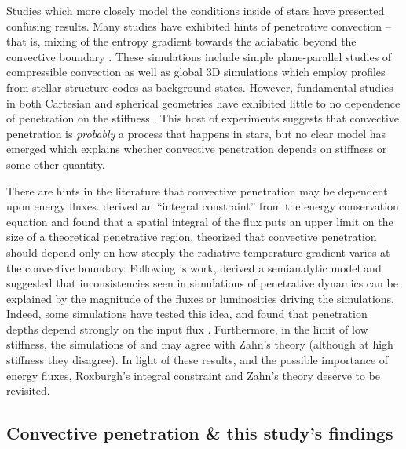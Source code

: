\documentclass[twocolumn]{aastex631}
\begin{document}
Studies which more closely model the conditions inside of stars have presented confusing results.
Many studies have exhibited hints of penetrative convection -- that is, mixing of the entropy gradient towards the adiabatic beyond the convective boundary \citep{hurlburt_etal_1986, hurlburt_etal_1994, singh_etal_1995, saikia_etal_2000, browning_etal_2004, rogers_etal_2006, kitiashvili_etal_2016, brun_etal_2017, pratt_etal_2017, higl_etal_2021}.
These simulations include simple plane-parallel studies of compressible convection as well as global 3D simulations which employ profiles from stellar structure codes as background states.
However, fundamental studies in both Cartesian and spherical geometries have exhibited little to no dependence of penetration on the stiffness \citep{brummell_etal_2002, rogers_glatzmaier_2005}.
This host of experiments suggests that convective penetration is \emph{probably} a process that happens in stars, but no clear model has emerged which explains whether convective penetration depends on stiffness or some other quantity.

There are hints in the literature that convective penetration may be dependent upon energy fluxes.
\citet{roxburgh1978, roxburgh1989, roxburgh1992, roxburgh1998} derived an ``integral constraint'' from the energy conservation equation and found that a spatial integral of the flux puts an upper limit on the size of a theoretical penetrative region.
\citet{zahn1991} theorized that convective penetration should depend only on how steeply the radiative temperature gradient varies at the convective boundary.
Following \citet{zahn1991}'s work, \citet{rempel2004} derived a semianalytic model and suggested that inconsistencies seen in simulations of penetrative dynamics can be explained by the magnitude of the fluxes or luminosities driving the simulations.
Indeed, some simulations have tested this idea, and found that penetration depths depend strongly on the input flux \citep{singh_etal_1998, kapyla_etal_2007, tian_etal_2009, hotta2017, kapyla2019}.
Furthermore, in the limit of low stiffness, the simulations of \citet{hurlburt_etal_1994} and \citet{rogers_glatzmaier_2005} may agree with Zahn's theory (although at high stiffness they disagree).
In light of these results, and the possible importance of energy fluxes, Roxburgh's integral constraint and Zahn's theory deserve to be revisited.

\subsection{Convective penetration \& this study's findings}
\end{document}
